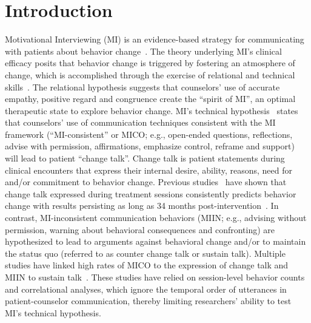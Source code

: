 \documentclass[smallextended]{svjour3}       %
\begin{document}
\section{Introduction}
\label{sec:intro}
Motivational Interviewing (MI) is an evidence-based strategy for communicating with patients about behavior change~\cite{miller2013motivational}. The theory underlying MI's clinical efficacy posits that behavior change is triggered by fostering an atmosphere of change, which is accomplished through the exercise of relational and technical skills~\cite{miller2013motivational}. The relational hypothesis suggests that counselors' use of accurate empathy, positive regard and congruence create the ``spirit of MI'', an optimal therapeutic state to explore behavior change. MI's technical hypothesis~\cite{miller2009toward} states that counselors' use of communication techniques consistent with the MI framework (``MI-consistent'' or MICO; e.g., open-ended questions, reflections, advise with permission, affirmations, emphasize control, reframe and support) will lead to patient ``change talk''. Change talk is patient statements during clinical encounters that express their internal desire, ability, reasons, need for and/or commitment to behavior change. Previous studies~\cite{apodaca2009mechanisms} have shown that change talk expressed during treatment sessions consistently predicts behavior change with results persisting as long as 34 months post-intervention~\cite{walker2011influence}. In contrast, MI-inconsistent communication behaviors (MIIN; e.g., advising without permission, warning about behavioral consequences and confronting) are hypothesized to lead to arguments against behavioral change and/or to maintain the status quo (referred to as counter change talk or sustain talk). Multiple studies have linked high rates of MICO to the expression of change talk and MIIN to sustain talk~\cite{magill2014technical}. These studies have relied on session-level behavior counts and correlational analyses, which ignore the temporal order of utterances in patient-counselor communication, thereby limiting researchers' ability to test MI's technical hypothesis. 
\end{document}
